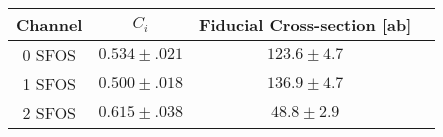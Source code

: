\begin{tabular}{|c||c|c|c|}
\hline
 Channel & $C_i$   & Fiducial Cross-section [ab]\\
\hline\hline
0 SFOS &  $0.534 \pm .021$ & $123.6 \pm 4.7$\\
1 SFOS &  $0.500 \pm .018$ & $136.9 \pm 4.7$\\
2 SFOS &  $0.615 \pm .038$ & $48.8  \pm 2.9$ \\
\hline
\end{tabular}
